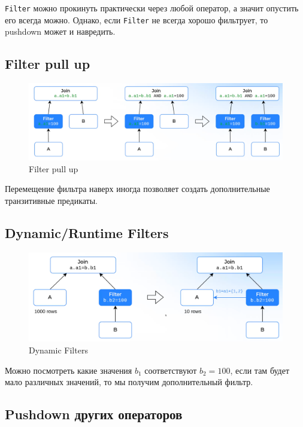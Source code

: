 \documentclass[11pt]{article}
\begin{document}
    \texttt{Filter} можно прокинуть практически через любой оператор, а значит опустить его всегда можно.
    Однако, если \texttt{Filter} не всегда хорошо фильтрует, то pushdown может и навредить.

    \subsection{Filter pull up}

    \begin{figure}[h!]
        \centering
        \includegraphics[width=\textwidth]{Pictures/Ключевые оптимизации/Filter pull up}
        \caption{Filter pull up}
    \end{figure}

    Перемещение фильтра наверх иногда позволяет создать дополнительные транзитивные предикаты.

    \subsection{Dynamic/Runtime Filters}

    \begin{figure}[h!]
        \centering
        \includegraphics[width=\textwidth]{Pictures/Ключевые оптимизации/Dynamic filters}
        \caption{Dynamic Filters}
    \end{figure}

    Можно посмотреть какие значения $b_1$ соответствуют $b_2 = 100$, если там будет мало различных значений, то мы получим дополнительный фильтр.

    \subsection{Pushdown других операторов}
\end{document}
